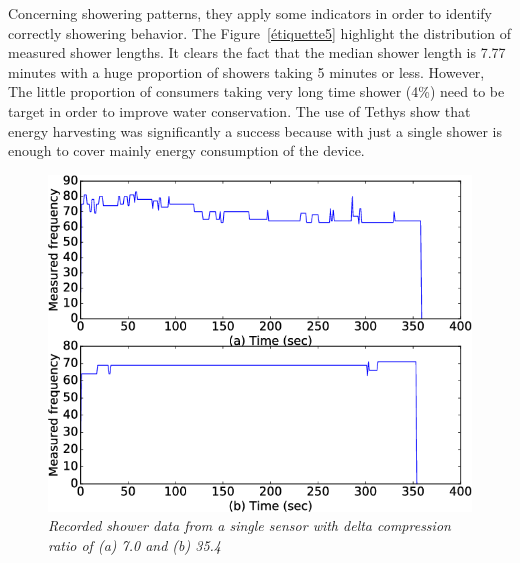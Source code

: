 \documentclass[10pt,journal,compsoc]{IEEEtran}
\begin{document}
Concerning showering patterns, they apply some indicators in order to identify correctly showering behavior. The Figure~\ref{étiquette5} highlight the distribution of measured shower lengths. It clears the fact that the median shower length is 7.77 minutes with a huge proportion of showers taking 5 minutes or less. However, The little proportion of consumers taking very long time shower (4\%) need to be target in order to improve water conservation. 
The use of Tethys show that energy harvesting was significantly a success because with just a single shower is enough to cover mainly energy consumption of the device. 

\begin{center}
    \begin{figure}[!t]
        \includegraphics[scale=0.4]{record-shower-comparison.png}
        \caption{\label{étiquette4} \emph{Recorded shower data from a single sensor with delta compression ratio of (a) 7.0 and (b) 35.4} \cite{IEEEhowto:}}
    \end{figure}

\end{center}
\end{document}
